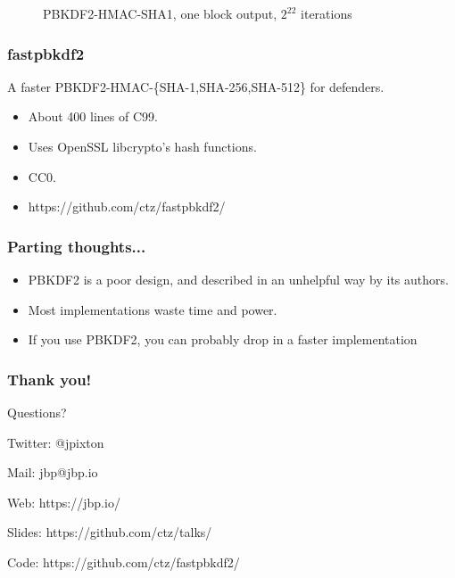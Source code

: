 \documentclass{beamer}
\begin{document}
{\begin{figure}
  
  \caption{PBKDF2-HMAC-SHA1, one block output, $2^{22}$ iterations}
  \end{figure}

}

\frame
{
  \frametitle{fastpbkdf2}

  A faster PBKDF2-HMAC-\{SHA-1,SHA-256,SHA-512\} for defenders.

  \begin{itemize}
    \item<1-> About 400 lines of C99.
    \item<2-> Uses OpenSSL libcrypto's hash functions.
    \item<3-> CC0.
    \item<4-> https://github.com/ctz/fastpbkdf2/
  \end{itemize}
}

\frame
{
  \frametitle{Parting thoughts...}

  \begin{itemize}
    \item<1-> PBKDF2 is a poor design, and described in an unhelpful way by its authors.
    \item<2-> Most implementations waste time and power.
    \item<3-> If you use PBKDF2, you can probably drop in a faster implementation
  \end{itemize}
}

\frame
{
  \frametitle{Thank you!}
  Questions?

  \vspace{5em}

  Twitter: @jpixton

  Mail: jbp@jbp.io

  Web: https://jbp.io/

  Slides: https://github.com/ctz/talks/

  Code: https://github.com/ctz/fastpbkdf2/
}
\end{document}
